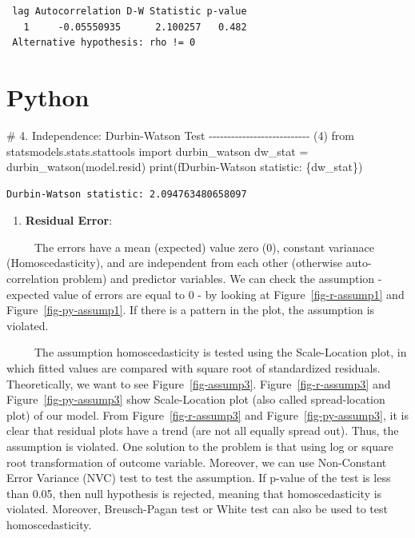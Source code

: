 \documentclass[
  letterpaper,
  DIV=11,
  numbers=noendperiod]{scrreprt}
\newenvironment{Shaded}{\begin{snugshade}}{\end{snugshade}}
\newcommand{\BuiltInTok}[1]{\textcolor[rgb]{0.00,0.23,0.31}{#1}}
\newcommand{\CommentTok}[1]{\textcolor[rgb]{0.37,0.37,0.37}{#1}}
\newcommand{\ImportTok}[1]{\textcolor[rgb]{0.00,0.46,0.62}{#1}}
\newcommand{\NormalTok}[1]{\textcolor[rgb]{0.00,0.23,0.31}{#1}}
\newcommand{\OperatorTok}[1]{\textcolor[rgb]{0.37,0.37,0.37}{#1}}
\newcommand{\SpecialCharTok}[1]{\textcolor[rgb]{0.37,0.37,0.37}{#1}}
\newcommand{\SpecialStringTok}[1]{\textcolor[rgb]{0.13,0.47,0.30}{#1}}
\providecommand{\tightlist}{%
  \setlength{\itemsep}{0pt}\setlength{\parskip}{0pt}}
\begin{document}
\begin{verbatim}
 lag Autocorrelation D-W Statistic p-value
   1     -0.05550935      2.100257   0.482
 Alternative hypothesis: rho != 0
\end{verbatim}

\section{Python}

\begin{Shaded}
\begin{Highlighting}[]
\CommentTok{\# 4. Independence: Durbin{-}Watson Test {-}{-}{-}{-}{-}{-}{-}{-}{-}{-}{-}{-}{-}{-}{-}{-}{-}{-}{-}{-}{-}{-}{-}{-}{-}{-}{-} (4)}
\ImportTok{from}\NormalTok{ statsmodels.stats.stattools }\ImportTok{import}\NormalTok{ durbin\_watson}
\NormalTok{dw\_stat }\OperatorTok{=}\NormalTok{ durbin\_watson(model.resid)}
\BuiltInTok{print}\NormalTok{(}\SpecialStringTok{f\textquotesingle{}Durbin{-}Watson statistic: }\SpecialCharTok{\{}\NormalTok{dw\_stat}\SpecialCharTok{\}}\SpecialStringTok{\textquotesingle{}}\NormalTok{)}
\end{Highlighting}
\end{Shaded}

\begin{verbatim}
Durbin-Watson statistic: 2.094763480658097
\end{verbatim}

\begin{enumerate}
\def\labelenumi{\arabic{enumi}.}
\setcounter{enumi}{2}
\tightlist
\item
  \textbf{Residual Error}:
\end{enumerate}

~~~~~The errors have a mean (expected) value zero (\(0\)), constant
varianace (Homoscedasticity), and are independent from each other
(otherwise auto-correlation problem) and predictor variables. We can
check the assumption - expected value of errors are equal to 0 - by
looking at Figure~\ref{fig-r-assump1} and Figure~\ref{fig-py-assump1}.
If there is a pattern in the plot, the assumption is violated.

~~~~~The assumption homoscedasticity is tested using the Scale-Location
plot, in which fitted values are compared with square root of
standardized residuals. Theoretically, we want to see
Figure~\ref{fig-assump3}. Figure~\ref{fig-r-assump3} and
Figure~\ref{fig-py-assump3} show Scale-Location plot (also called
spread-location plot) of our model. From Figure~\ref{fig-r-assump3} and
Figure~\ref{fig-py-assump3}, it is clear that residual plots have a
trend (are not all equally spread out). Thus, the assumption is
violated. One solution to the problem is that using log or square root
transformation of outcome variable. Moreover, we can use Non-Constant
Error Variance (NVC) test to test the assumption. If p-value of the test
is less than 0.05, then null hypothesis is rejected, meaning that
homoscedasticity is violated. Moreover, Breusch-Pagan test or White test
can also be used to test homoscedasticity.
\end{document}
